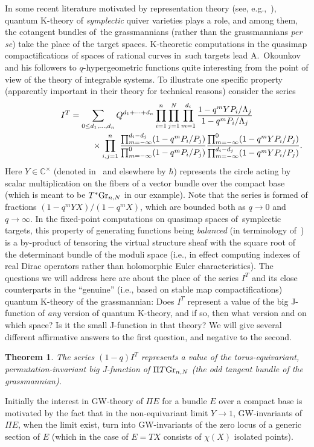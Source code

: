 \documentclass[10pt,a4paper]{amsart}
\numberwithin{equation}{section}
\newtheorem{Theorem}{Theorem}[section]
\def\CC{\mathbb C}
\theoremstyle{definition}
\theoremstyle{plain}
\begin{document}
In some recent literature motivated by representation theory (see, e.g.,~\cite{KPSZ, Ok, PSZ}), quantum K-theory of {\em symplectic} quiver varieties plays a role, and among them, the cotangent bundles of~the grassmannians (rather than the grassmannians {\em per se}) take the place of the target spaces. K-theoretic computations in the quasimap compactifications of spaces of rational curves in~such targets lead A.~Okounkov and his followers to $q$-hypergeometric functions quite interesting from the point of view of the theory of integrable systems. To illustrate one specific property (appa\-rently important in their theory for technical reasons) consider the series
\begin{gather*}
I^T= \sum_{0\leq d_1,\dots,d_n}Q^{d_1+\cdots+d_n} \prod_{i=1}^n\prod_{j=1}^N\prod_{m=1}^{d_i}\frac{1-q^mYP_i/\Lambda_j} {1-q^mP_i/\Lambda_j}
\\ \hphantom{I^T=\sum_{0\leq d_1,\dots,d_n}Q^{d_1+\cdots} }
{}\times \prod_{i,j=1}^n\frac{\prod_{m=-\infty}^{d_i-d_j}(1-q^mP_i/P_j)}{\prod_{m=-\infty}^0(1-q^mP_i/P_j)}
\frac{\prod_{m=-\infty}^0(1-q^mY P_i/P_j)}{\prod_{m=-\infty}^{d_i-d_j}(1-q^mY P_i/P_j)}.
\end{gather*}
Here $Y\in \CC^{\times}$ (denoted in~\cite{Ok} and elsewhere by $\hbar$) represents the circle acting by scalar multiplication on the fibers of a vector bundle over the compact base (which is meant to be $T^*{\rm Gr}_{n,N}$ in our example). Note that the series is formed of fractions $(1-q^mY X)/(1-q^m X)$, which are bounded both as $q\to 0$ and $q\to \infty$. In the fixed-point computations on quasimap spaces of~symplectic targets, this property of generating functions being {\em balanced} (in terminology of~\cite{Liu}) is a by-product of tensoring the virtual structure sheaf with the square root of the determinant bundle of the moduli space (i.e., in effect computing indexes of real Dirac operators rather than holomorphic Euler characteristics). The questions we will address here are about the place of~the
series $I^T$ and its close counterparts in the ``genuine'' (i.e., based on stable map compactifications) quantum K-theory of the grassmannian: Does $I^T$ represent a value of the big J-function of {\em any} version of quantum K-theory, and if so, then what version and on which space? Is it the small J-function in that theory? We will give several different affirmative answers to the first question, and negative to the second.

\begin{Theorem}\label{thm4}
The series $(1-q) I^T$ represents a value of the torus-equivariant, permutation-invariant big J-function of $\Pi T {\rm Gr}_{n,N}$ (the odd tangent bundle of the grassmannian).
\end{Theorem}
Initially the interest in GW-theory of $\Pi E$ for a bundle $E$ over a compact base is motivated by the fact that in the non-equivariant limit $Y\to 1$, GW-invariants of $\Pi E$, when the limit exist, turn into GW-invariants of the zero locus of a generic section of $E$ (which in the case of $E=TX$ consists of $\chi (X)$ isolated points).
\end{document}
